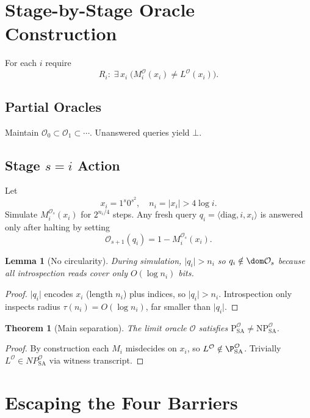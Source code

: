 \documentclass[12pt]{article}
\newcommand{\classP}{\mathrm{P}}
\newcommand{\classNP}{\mathrm{NP}}
\newcommand{\SA}{\mathrm{SA}}
\newcommand{\OO}{\mathcal{O}}
\theoremstyle{definition}
\theoremstyle{plain}
\newtheorem{lemma}[definition]{Lemma}
\newtheorem{theorem}[definition]{Theorem}
\begin{document}
\section{Stage-by-Stage Oracle Construction}
For each \(i\) require
\[
  R_i:\;\exists\,x_i\;\bigl(M_i^\OO(x_i)\neq L^\OO(x_i)\bigr).
\]

\subsection{Partial Oracles}
Maintain \(\OO_0\subset\OO_1\subset\cdots\).  Unanswered queries yield \(\bot\).

\subsection{Stage \(s=i\) Action}
Let
\[
  x_i = 1^s0^{s^2},\quad n_i=|x_i|>4\log i.
\]
Simulate \(M_i^{\OO_s}(x_i)\) for \(2^{n_i/4}\) steps.  Any fresh
query \(q_i=\langle\mathrm{diag},i,x_i\rangle\) is answered only after
halting by setting
\[
  \OO_{s+1}(q_i)
  =1-M_i^{\OO_s}(x_i).
\]

\begin{lemma}[No circularity]\label{lem:nocirc}
During simulation, \(\lvert q_i\rvert>n_i\) so \(q_i\notin\dom\OO_s\)
because all introspection reads cover only \(O(\log n_i)\) bits.
\end{lemma}

\begin{proof}
\(\lvert q_i\rvert\) encodes \(x_i\) (length \(n_i\)) plus indices, so
\(\lvert q_i\rvert>n_i\).  Introspection only inspects radius
\(\tau(n_i)=O(\log n_i)\), far smaller than \(\lvert q_i\rvert\).
\end{proof}

\begin{theorem}[Main separation]\label{thm:main-sep}
The limit oracle \(\OO\) satisfies
\(\classP_{\SA}^\OO\neq\classNP_{\SA}^\OO\).
\end{theorem}

\begin{proof}
By construction each \(M_i\) misdecides on \(x_i\), so \(L^\OO\notin
\P_{\SA}^\OO\).  Trivially \(L^\OO\in NP_{\SA}^\OO\) via witness transcript.
\end{proof}

\section{Escaping the Four Barriers}
\end{document}
